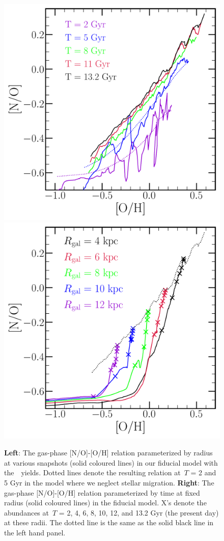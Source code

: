 \documentclass[ms.tex]{subfiles}
\begin{document}
\begin{figure} 
\centering 
\includegraphics[scale = 0.45]{no_oh_timeevol.pdf} 
\includegraphics[scale = 0.45]{no_oh_superposition.pdf} 
\caption{
\textbf{Left}: The gas-phase [N/O]-[O/H] relation parameterized by radius at 
various snapshots (solid coloured lines) in our fiducial model with 
the~\cristallo~yields. 
Dotted lines denote the resulting relation at~$T$ = 2 and 5 Gyr in the model 
where we neglect stellar migration. 
\textbf{Right}: The gas-phase [N/O]-[O/H] relation parameterized by time at 
fixed radius (solid coloured lines) in the fiducial model. 
X's denote the abundances at~$T$ = 2, 4, 6, 8, 10, 12, and 13.2 Gyr (the 
present day) at these radii. 
The dotted line is the same as the solid black line in the left hand panel. 
} 
\label{fig:no_oh_timeevol} 
\end{figure} 
\end{document}

